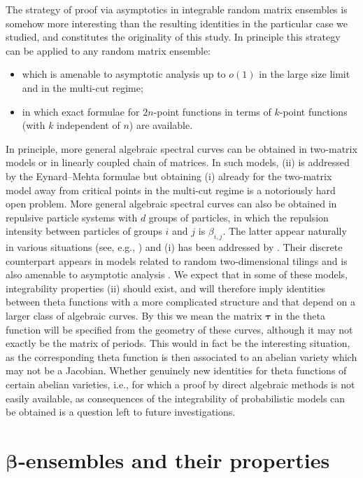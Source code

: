 \documentclass[pdftex]{sigma}
\numberwithin{equation}{section}
\begin{document}
The strategy of proof via asymptotics in integrable random matrix ensembles is somehow more interesting than the resulting identities in the particular case we studied, and constitutes the originality of this study. In principle this strategy can be applied to any random matrix ensemble:
\begin{itemize}\itemsep=0pt
\item[(i)] which is amenable to asymptotic analysis up to $o(1)$ in the large size limit and in the multi-cut regime;
\item[(ii)] in which exact formulae for $2n$-point functions in terms of $k$-point functions (with $k$ independent of $n$) are available.
\end{itemize}
In principle, more general algebraic spectral curves can be obtained in two-matrix models or in linearly coupled chain of matrices. In such models, (ii) is addressed by the Eynard--Mehta formulae \cite{EM} but obtaining (i) already for the two-matrix model away from critical points in the multi-cut regime is a notoriously hard open problem. More general algebraic spectral curves can also be obtained in repulsive particle systems with $d$ groups of particles, in which the repulsion intensity between particles of groups $i$ and $j$ is $\beta_{i,j}$. The latter appear naturally in various situations (see, e.g., \cite{BEO,BEW}) and (i) has been addressed by \cite{BGK}. Their discrete counterpart appears in models related to random two-dimensional tilings and is also amenable to asymptotic analysis \cite{BGG}. We expect that in some of these models, integrability properties (ii) should exist, and will therefore imply identities between theta functions with a more complicated structure and that depend on a larger class of algebraic curves. By this we mean the matrix $\boldsymbol{\tau}$ in the theta function will be specified from the geometry of these curves, although it may not exactly be the matrix of periods. This would in fact be the interesting situation, as the corresponding theta function is then associated to an abelian variety which may not be a Jacobian. Whether genuinely new identities for theta functions of certain abelian varieties, i.e., for which a proof by direct algebraic methods is not easily available, as consequences of the integrability of probabilistic models can be obtained is a question left to future investigations.

\section[beta-ensembles and their properties]{$\boldsymbol{\beta}$-ensembles and their properties}
\end{document}
